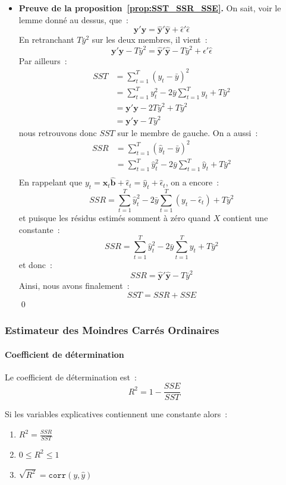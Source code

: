 \documentclass[10pt]{beamer}
\begin{document}
\begin{notes}
\begin{itemize}
\item \textbf{Preuve de la proposition~\ref{prop:SST_SSR_SSE}.} On sait, voir le lemme donné au dessus, que~:
  \[
    \mathbf y'\mathbf y = \hat{\mathbf y}' \hat{\mathbf y} + \hat\epsilon'\hat\epsilon
  \]
  En retranchant $T\bar y^2$ sur les deux membres, il vient~:
  \[
    \mathbf y'\mathbf y - T\bar y^2 = \hat{\mathbf y}' \hat{\mathbf y} - T\bar y^2 + \hat\epsilon'\hat\epsilon
  \]
  Par ailleurs~:
  \[
    \begin{split}
      SST &= \sum_{t=1}^T(y_t-\bar y)^2\\
          &= \sum_{t=1}^Ty_t^2 - 2\bar y\sum_{t=1}^Ty_t + T\bar y^2\\
          &= \mathbf y'\mathbf y - 2T\bar y^2 + T\bar y^2\\
          &= \mathbf y'\mathbf y - T\bar y^2
    \end{split}
  \]
  nous retrouvons donc $SST$ sur le membre de gauche. On a aussi~:
\[
    \begin{split}
      SSR &= \sum_{t=1}^T(\hat y_t-\bar y)^2\\
          &= \sum_{t=1}^T\hat y_t^2 - 2\bar y\sum_{t=1}^T\hat y_t + T\bar y^2\\
    \end{split}
  \]
  En rappelant que  $y_t = \mathbf x_t \hat{\mathbf b} + \hat\epsilon_t = \hat y_t + \hat\epsilon_t$, on a encore~:
  \[
    SSR= \sum_{t=1}^T\hat y_t^2 - 2\bar y\sum_{t=1}^T (y_t-\hat\epsilon_t) + T\bar y^2
  \]
  et puisque les résidus estimés somment à zéro quand $X$ contient une constante~:
  \[
    SSR = \sum_{t=1}^T\hat y_t^2 - 2\bar y\sum_{t=1}^T y_t + T\bar y^2
  \]
  et donc~:
  \[
    SSR = \hat{\mathbf y}'\hat{\mathbf y} - T\bar y^2
  \]
Ainsi, nous avons finalement~:
  \[
    SST = SSR + SSE
  \]
  \qed\newline

  \end{itemize}
\end{notes}


\begin{frame}
  \frametitle{Estimateur des Moindres Carrés Ordinaires}
  \framesubtitle{Coefficient de détermination}

  \begin{defn}{}
    Le coefficient de détermination est~:
    \[
      R^2 = 1 - \frac{SSE}{SST}
    \]
  \end{defn}

  \bigskip

  \begin{prop}\label{prop:r2}
    Si les variables explicatives contiennent une constante alors~:
    \begin{enumerate}
      \item $R^2 = \frac{SSR}{SST}$
      \item $0 \leq R^2 \leq 1$
      \item $\sqrt{R^2} = \mathtt{corr}(y,\hat y)$
    \end{enumerate}
  \end{prop}

\end{frame}
\end{document}
